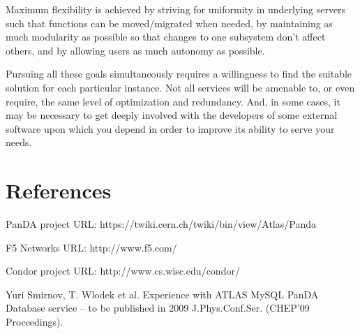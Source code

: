 \documentclass[letterpaper]{jpconf}
\begin{document}
Maximum flexibility is achieved by striving for uniformity in underlying
servers such that functions can be moved/migrated when needed, by maintaining
as much modularity as possible so that changes to one subsystem don't affect
others, and by allowing users as much autonomy as possible. 

Pursuing all these goals simultaneously requires a willingness to find the
suitable solution for each particular instance. Not all services will be
amenable to, or even require, the same level of optimization and redundancy.
And, in some cases, it may be necessary to get deeply involved with the
developers of some external software upon which you depend in order to improve
its ability to serve your needs. 

\section*{References}

\begin{thebibliography}{9}

 PanDA project URL:
https://twiki.cern.ch/twiki/bin/view/Atlas/Panda

 F5 Networks URL: http://www.f5.com/

 Condor project URL: http://www.cs.wisc.edu/condor/

 Yuri Smirnov, T. Wlodek et al. Experience with ATLAS
MySQL PanDA Database service -- to be published in 2009 J.Phys.Conf.Ser. (CHEP'09 Proceedings).

\end{thebibliography}
\end{document}
